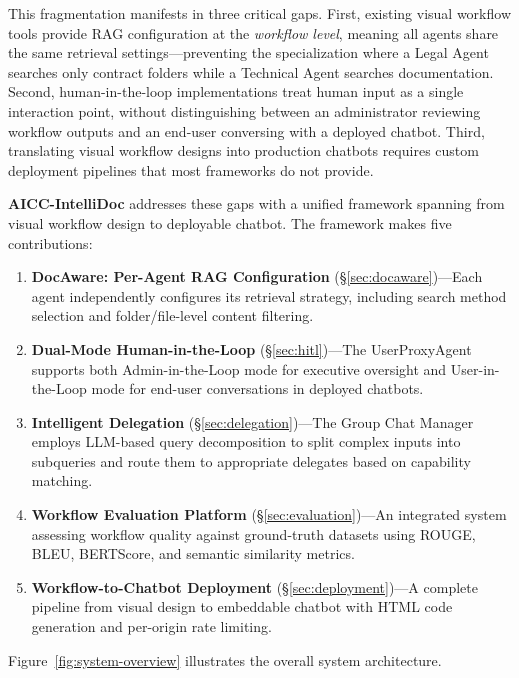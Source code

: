 \documentclass[11pt]{article}
\begin{document}
This fragmentation manifests in three critical gaps. First, existing visual workflow tools provide RAG configuration at the \textit{workflow level}, meaning all agents share the same retrieval settings—preventing the specialization where a Legal Agent searches only contract folders while a Technical Agent searches documentation. Second, human-in-the-loop implementations treat human input as a single interaction point, without distinguishing between an administrator reviewing workflow outputs and an end-user conversing with a deployed chatbot. Third, translating visual workflow designs into production chatbots requires custom deployment pipelines that most frameworks do not provide.

\textbf{AICC-IntelliDoc} addresses these gaps with a unified framework spanning from visual workflow design to deployable chatbot. The framework makes five contributions:

\begin{enumerate}
    \item \textbf{DocAware: Per-Agent RAG Configuration} (\S\ref{sec:docaware})—Each agent independently configures its retrieval strategy, including search method selection and folder/file-level content filtering.
    
    \item \textbf{Dual-Mode Human-in-the-Loop} (\S\ref{sec:hitl})—The UserProxyAgent supports both Admin-in-the-Loop mode for executive oversight and User-in-the-Loop mode for end-user conversations in deployed chatbots.
    
    \item \textbf{Intelligent Delegation} (\S\ref{sec:delegation})—The Group Chat Manager employs LLM-based query decomposition to split complex inputs into subqueries and route them to appropriate delegates based on capability matching.
    
    \item \textbf{Workflow Evaluation Platform} (\S\ref{sec:evaluation})—An integrated system assessing workflow quality against ground-truth datasets using ROUGE, BLEU, BERTScore, and semantic similarity metrics.
    
    \item \textbf{Workflow-to-Chatbot Deployment} (\S\ref{sec:deployment})—A complete pipeline from visual design to embeddable chatbot with HTML code generation and per-origin rate limiting.
\end{enumerate}

Figure~\ref{fig:system-overview} illustrates the overall system architecture.
\end{document}
